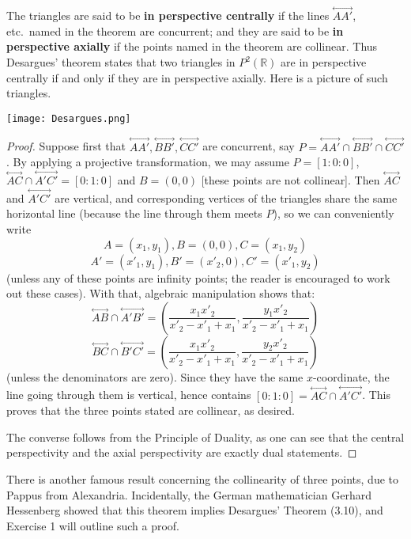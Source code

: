 \documentclass[leqno]{book}
\begin{document}
\noindent The triangles are said to be \textbf{in perspective centrally} if the lines $\overset{\longleftrightarrow}{AA'}$, etc.~named in the theorem are concurrent; and they are said to be \textbf{in perspective axially} if the points named in the theorem are collinear.  Thus Desargues' theorem states that two triangles in $P^2(\mathbb R)$ are in perspective centrally if and only if they are in perspective axially.  Here is a picture of such triangles.
\begin{center}
\texttt{[image: Desargues.png]}
\end{center}
\begin{proof}
Suppose first that $\overset{\longleftrightarrow}{AA'},\overset{\longleftrightarrow}{BB'},\overset{\longleftrightarrow}{CC'}$ are concurrent, say $P=\overset{\longleftrightarrow}{AA'}\cap\overset{\longleftrightarrow}{BB'}\cap\overset{\longleftrightarrow}{CC'}$.  By applying a projective transformation, we may assume $P=[1:0:0]$, $\overset{\longleftrightarrow}{AC}\cap\overset{\longleftrightarrow}{A'C'}=[0:1:0]$ and $B=(0,0)$ [these points are not collinear].  Then $\overset{\longleftrightarrow}{AC}$ and $\overset{\longleftrightarrow}{A'C'}$ are vertical, and corresponding vertices of the triangles share the same horizontal line (because the line through them meets $P$), so we can conveniently write
$$A=(x_1,y_1),B=(0,0),C=(x_1,y_2)$$
$$A'=(x'_1,y_1),B'=(x'_2,0),C'=(x'_1,y_2)$$
(unless any of these points are infinity points; the reader is encouraged to work out these cases).  With that, algebraic manipulation shows that:
$$\overset{\longleftrightarrow}{AB}\cap\overset{\longleftrightarrow}{A'B'}=\left(\frac{x_1x'_2}{x'_2-x'_1+x_1},\frac{y_1x'_2}{x'_2-x'_1+x_1}\right)$$
$$\overset{\longleftrightarrow}{BC}\cap\overset{\longleftrightarrow}{B'C'}=\left(\frac{x_1x'_2}{x'_2-x'_1+x_1},\frac{y_2x'_2}{x'_2-x'_1+x_1}\right)$$
(unless the denominators are zero).  Since they have the same $x$-coordinate, the line going through them is vertical, hence contains $[0:1:0]=\overset{\longleftrightarrow}{AC}\cap\overset{\longleftrightarrow}{A'C'}$.  This proves that the three points stated are collinear, as desired.

The converse follows from the Principle of Duality, as one can see that the central perspectivity and the axial perspectivity are exactly dual statements.
\end{proof}

\noindent There is another famous result concerning the collinearity of three points, due to Pappus from Alexandria.  Incidentally, the German mathematician Gerhard Hessenberg showed that this theorem implies Desargues' Theorem (3.10), and Exercise 1 will outline such a proof.\\
\end{document}
